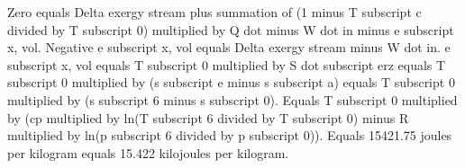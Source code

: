 Zero equals Delta exergy stream plus summation of (1 minus T subscript c divided by T subscript 0) multiplied by Q dot minus W dot in minus e subscript x, vol.  
Negative e subscript x, vol equals Delta exergy stream minus W dot in.  
e subscript x, vol equals T subscript 0 multiplied by S dot subscript erz equals T subscript 0 multiplied by (s subscript e minus s subscript a) equals T subscript 0 multiplied by (s subscript 6 minus s subscript 0).  
Equals T subscript 0 multiplied by (cp multiplied by ln(T subscript 6 divided by T subscript 0) minus R multiplied by ln(p subscript 6 divided by p subscript 0)).  
Equals 15421.75 joules per kilogram equals 15.422 kilojoules per kilogram.